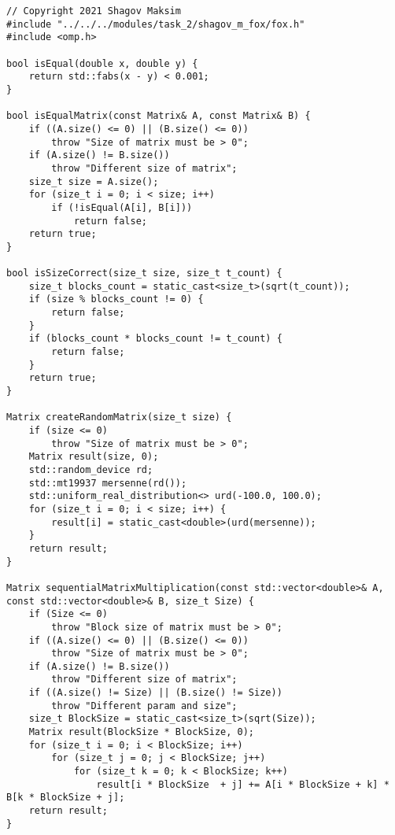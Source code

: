 \documentclass{report}
\begin{document}
\begin{lstlisting}
// Copyright 2021 Shagov Maksim
#include "../../../modules/task_2/shagov_m_fox/fox.h"
#include <omp.h>

bool isEqual(double x, double y) {
    return std::fabs(x - y) < 0.001;
}

bool isEqualMatrix(const Matrix& A, const Matrix& B) {
    if ((A.size() <= 0) || (B.size() <= 0))
        throw "Size of matrix must be > 0";
    if (A.size() != B.size())
        throw "Different size of matrix";
    size_t size = A.size();
    for (size_t i = 0; i < size; i++)
        if (!isEqual(A[i], B[i]))
            return false;
    return true;
}

bool isSizeCorrect(size_t size, size_t t_count) {
    size_t blocks_count = static_cast<size_t>(sqrt(t_count));
    if (size % blocks_count != 0) {
        return false;
    }
    if (blocks_count * blocks_count != t_count) {
        return false;
    }
    return true;
}

Matrix createRandomMatrix(size_t size) {
    if (size <= 0)
        throw "Size of matrix must be > 0";
    Matrix result(size, 0);
    std::random_device rd;
    std::mt19937 mersenne(rd());
    std::uniform_real_distribution<> urd(-100.0, 100.0);
    for (size_t i = 0; i < size; i++) {
        result[i] = static_cast<double>(urd(mersenne));
    }
    return result;
}

Matrix sequentialMatrixMultiplication(const std::vector<double>& A, const std::vector<double>& B, size_t Size) {
    if (Size <= 0)
        throw "Block size of matrix must be > 0";
    if ((A.size() <= 0) || (B.size() <= 0))
        throw "Size of matrix must be > 0";
    if (A.size() != B.size())
        throw "Different size of matrix";
    if ((A.size() != Size) || (B.size() != Size))
        throw "Different param and size";
    size_t BlockSize = static_cast<size_t>(sqrt(Size));
    Matrix result(BlockSize * BlockSize, 0);
    for (size_t i = 0; i < BlockSize; i++)
        for (size_t j = 0; j < BlockSize; j++)
            for (size_t k = 0; k < BlockSize; k++)
                result[i * BlockSize  + j] += A[i * BlockSize + k] * B[k * BlockSize + j];
    return result;
}


\end{lstlisting}
\end{document}

